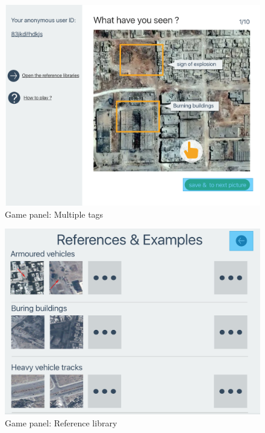 \noindent\begin{minipage}{.45\textwidth}
\begin{figure}[H]
\centering
\includegraphics[width=\textwidth]{figures/function-player-2}
\caption{Game panel: Multiple tags}
\label{fig:player2}
\end{figure}
\end{minipage}\hfill
\noindent\begin{minipage}{.45\textwidth}
\begin{figure}[H]
\centering
\includegraphics[width=\textwidth]{figures/function-player-3}
\caption{Game panel: Reference library}
\label{fig:player3}
\end{figure}
\end{minipage}\hfill


